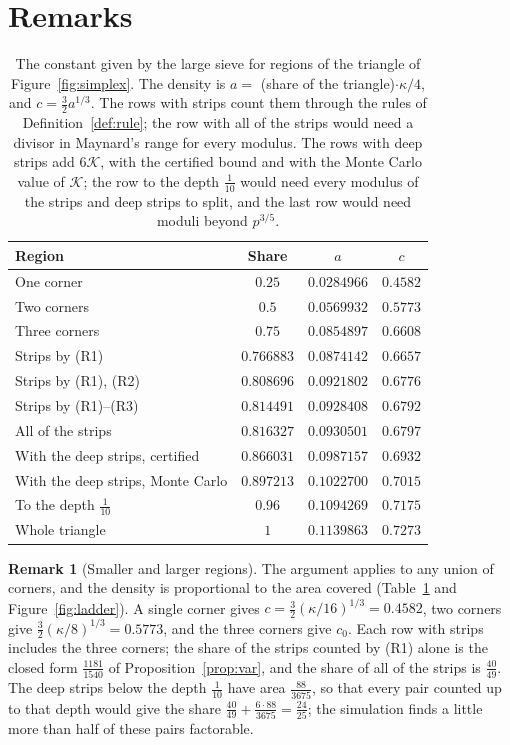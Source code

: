 \documentclass[aps,prd,twocolumn,superscriptaddress,nofootinbib,longbibliography,floatfix,showkeys,nobalancelastpage,amsmath,amssymb,10pt]{revtex4-2}
\theoremstyle{plain}
\theoremstyle{definition}
\newtheorem{remark}[theorem]{Remark}
\theoremstyle{plain}
\newcommand{\Kc}{\mathcal{K}}
\begin{document}
\section{Remarks}\label{sec:remarks}

\begin{table}[t]
\caption{The constant given by the large sieve for regions of the triangle of Figure~\ref{fig:simplex}. The density is $a=$ (share of the triangle)$\cdot\kappa/4$, and $c=\frac32a^{1/3}$. The rows with strips count them through the rules of Definition~\ref{def:rule}; the row with all of the strips would need a divisor in Maynard's range for every modulus. The rows with deep strips add $6\Kc$, with the certified bound and with the Monte Carlo value of $\Kc$; the row to the depth $\frac1{10}$ would need every modulus of the strips and deep strips to split, and the last row would need moduli beyond $p^{3/5}$.}
\label{tab:ladder}
\centering
\begin{tabular}{@{}lccc@{}}
\toprule
Region & Share & $a$ & $c$\\
\midrule
One corner & $0.25$ & $0.0284966$ & $0.4582$\\
Two corners & $0.5$ & $0.0569932$ & $0.5773$\\
Three corners & $0.75$ & $0.0854897$ & $0.6608$\\
Strips by (R1) & $0.766883$ & $0.0874142$ & $0.6657$\\
Strips by (R1), (R2) & $0.808696$ & $0.0921802$ & $0.6776$\\
Strips by (R1)--(R3) & $0.814491$ & $0.0928408$ & $0.6792$\\
All of the strips & $0.816327$ & $0.0930501$ & $0.6797$\\
With the deep strips, certified & $0.866031$ & $0.0987157$ & $0.6932$\\
With the deep strips, Monte Carlo & $0.897213$ & $0.1022700$ & $0.7015$\\
To the depth $\frac1{10}$ & $0.96$ & $0.1094269$ & $0.7175$\\
Whole triangle & $1$ & $0.1139863$ & $0.7273$\\
\bottomrule
\end{tabular}
\end{table}

\begin{remark}[Smaller and larger regions]\label{rem:ladder}
The argument applies to any union of corners, and the density is proportional to the area covered (Table~\ref{tab:ladder} and Figure~\ref{fig:ladder}). A single corner gives $c=\frac32(\kappa/16)^{1/3}=0.4582$, two corners give $\frac32(\kappa/8)^{1/3}=0.5773$, and the three corners give $c_0$. Each row with strips includes the three corners; the share of the strips counted by (R1) alone is the closed form $\frac{1181}{1540}$ of Proposition~\ref{prop:var}, and the share of all of the strips is $\frac{40}{49}$. The deep strips below the depth $\frac1{10}$ have area $\frac{88}{3675}$, so that every pair counted up to that depth would give the share $\frac{40}{49}+\frac{6\cdot88}{3675}=\frac{24}{25}$; the simulation finds a little more than half of these pairs factorable.
\end{remark}
\end{document}

